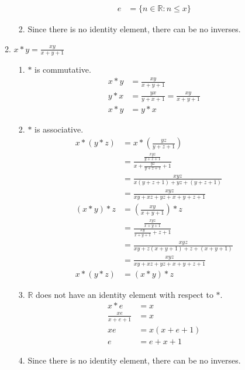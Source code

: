 \begin{enumerate}[label={\Alph*.},font={\bfseries}]
\begin{enumerate}[label={\arabic*},font={\bfseries}]
\begin{enumerate}[label={(\roman*)}]
\begin{align*}
              e &= \{ n\in\mathbb{R} : n \leq x \}
            \end{align*}
          \item Since there is no identity element, there can be no inverses.
        \end{enumerate}
      \item $x*y=\frac{xy}{x+y+1}$
        \begin{enumerate}[label={(\roman*)}]
          \item $*$ is commutative.
            \begin{align*}
              x*y &= \frac{xy}{x+y+1} \\
              y*x &= \frac{yx}{y+x+1} = \frac{xy}{x+y+1} \\
              x*y &= y*x
            \end{align*}
          \item $*$ is associative.
            \begin{align*}
              x*(y*z) &= x*(\frac{yz}{y+z+1}) \\
              &= \frac{\frac{xyz}{y+z+1}}{x+\frac{yz}{y+z+1}+1} \\
              &= \frac{xyz}{x(y+z+1)+yz+(y+z+1)} \\
              &= \frac{xyz}{xy+xz+yz+x+y+z+1} \\
              (x*y)*z &= \left(\frac{xy}{x+y+1}\right)*z \\
              &= \frac{\frac{xyz}{x+y+1}}{\frac{xy}{x+y+1}+z+1} \\
              &= \frac{xyz}{xy+z(x+y+1)+z+(x+y+1)} \\
              &= \frac{xyz}{xy+xz+yz+x+y+z+1} \\
              x*(y*z) &= (x*y)*z
            \end{align*}
          \item $\mathbb{R}$ does not have an identity element with respect to $*$.
            \begin{align*}
              x*e &= x \\
              \frac{xe}{x+e+1} &= x \\
              xe &= x(x+e+1) \\
              e &= e+x+1
            \end{align*}
          \item Since there is no identity element, there can be no inverses.
        \end{enumerate}
    \end{enumerate}

\end{enumerate}

